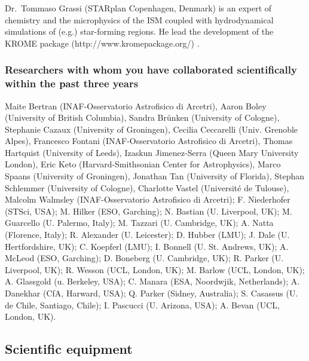 \documentclass[10pt,fleqn,twoside]{article}
\begin{document}
Dr.\ Tommaso Grassi (STARplan Copenhagen, Denmark) is an expert of
chemistry and the microphysics of the ISM coupled with hydrodynamical
simulations of (e.g.) star-forming regions. He lead the development of the
KROME package (http://www.kromepackage.org/) . 

\subsubsection{Researchers with whom you have collaborated scientifically within the past three years}

Maite Bertran (INAF-Osservatorio Astrofisico di Arcetri), Aaron Boley (University of British Columbia), Sandra Brünken (University of Cologne), Stephanie Cazaux (University of Groningen), Cecilia Ceccarelli (Univ. Grenoble Alpes), Francesco Fontani (INAF-Osservatorio Astrofisico di Arcetri), Thomas Hartquist (University of Leeds), Izaskun Jimenez-Serra (Queen Mary University London), Eric Keto (Harvard-Smithsonian Center for Astrophysics), Marco Spaans (University of Groningen), Jonathan Tan (University of Florida), Stephan Schlemmer (University of Cologne), Charlotte Vastel (Université de Tulouse), Malcolm Walmsley (INAF-Osservatorio Astrofisico di Arcetri);
F. Niederhofer (STSci, USA); M. Hilker (ESO, Garching); N. Bastian (U. Liverpool,
UK); M. Guarcello (U. Palermo, Italy); M. Tazzari (U. Cambridge, UK);
A. Natta (Florence, Italy); R. Alexander (U. Leicester); D. Hubber
(LMU); J. Dale (U. Hertfordshire, UK); C. Koepferl (LMU); I. Bonnell
(U. St. Andrews, UK); A. McLeod (ESO, Garching); D. Boneberg
(U. Cambridge, UK); R. Parker (U. Liverpool, UK); R. Wesson (UCL,
London, UK); M. Barlow (UCL, London, UK); A. Glassgold (u. Berkeley,
USA); C. Manara (ESA, Noordwjik, Netherlands); A. Danekhar (CfA,
Harward, USA); Q. Parker (Sidney, Australia); S. Casassus
(U. de Chile, Santiago, Chile); I. Pascucci (U. Arizona, USA);
A. Bevan (UCL, London, UK).

\subsection{Scientific equipment}
\end{document}
